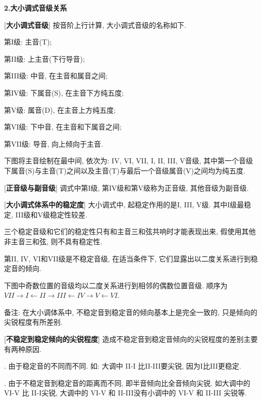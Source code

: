 \clearpage

\begin{center}
 \textbf{2.大小调式音级关系}\\
\end{center}

[\textbf{大小调式音级}] 按音阶上行计算, 大小调式音级的名称如下.\par
\qquad 第I级: 主音(T);\par
\qquad 第II级: 上主音(下行导音);\par
\qquad 第III级: 中音, 在主音和属音之间;\par
\qquad 第IV级: 下属音(S), 在主音下方纯五度;\par
\qquad 第V级: 属音(D), 在主音上方纯五度;\par
\qquad 第VI级: 下中音, 在主音和下属音之间;\par
\qquad 第VII级: 导音, 向上倾向于主音.\par
\qquad 下图将主音绘制在最中间, 依次为: IV, VI, VII, I, II, III, V音级, 其中第一个音级下属音(S)与主音(T)之间以及主音(T)与最后一个音级属音(V)之间均为纯五度.\par
\startextract
\Notes {}\en
\zendextract

[\textbf{正音级与副音级}] 调式中第I级, 第IV级和第V级称为正音级, 其他音级为副音级.\par

[\textbf{大小调式体系中的稳定度}] 大小调式中, 起稳定作用的是I, III, V级. 其中I级最稳定, III级和V级稳定性较差.\par
\qquad 三个稳定音级和它们的稳定性只有和主音三和弦共响时才能表现出来, 假使用其他非主音三和弦, 则不具有稳定性.\par
\qquad 第II, IV, VI和VII级是不稳定音级, 在适当条件下, 它们显露出以二度关系进行到稳定音的倾向.\par
\qquad 下图中奇数位置的音级均以二度关系进行到相邻的偶数位置音级. 顺序为$VII\rightarrow I\leftarrow II\rightarrow III \leftarrow IV \rightarrow V\leftarrow VI$.\par
\startextract
\Notes {}\en
\zendextract
\qquad 备注: 在大小调体系中, 不稳定音到稳定音的倾向基本上是完全一致的, 只是倾向的尖锐程度有所差别.\par

[\textbf{不稳定到稳定倾向的尖锐程度}] 造成不稳定音到稳定音倾向的尖锐程度的差别主要有两种原因.\par
{}. 由于稳定音的不同而不同. 如: 大调中 II-I 比II-III要尖锐, 因为I比III更稳定.\par
{}. 由于不稳定音到稳定音的距离而不同, 即半音倾向比全音倾向尖锐. 如大调中的 VI-V 比 II-I尖锐, 大调中的 VI-V 和 II-III没有小调中的 VI-V 和 II-III 尖锐等.\par

